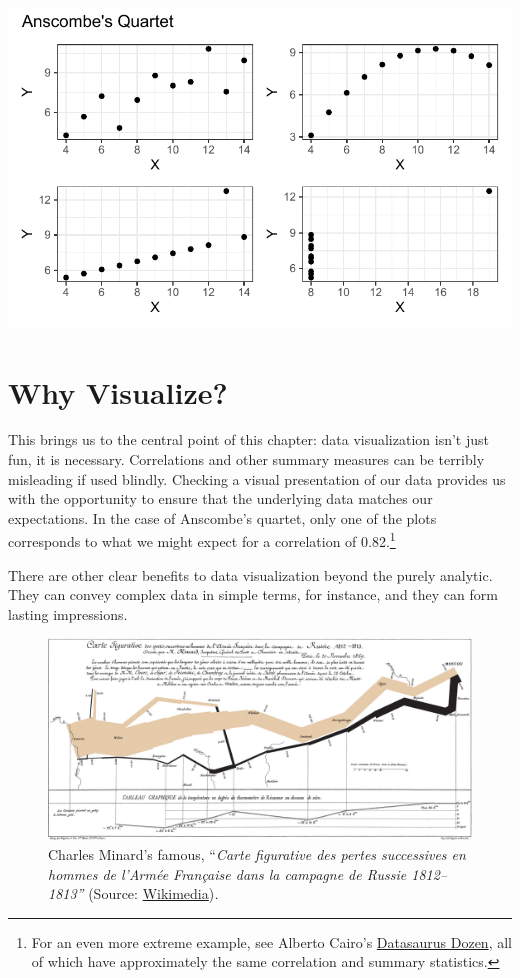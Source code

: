 \documentclass[
  letterpaper,
]{book}
\begin{document}
\includegraphics{visualizing-with-ggplot_files/figure-pdf/unnamed-chunk-8-1.pdf}

\hypertarget{why-visualize}{%
\section{Why Visualize?}\label{why-visualize}}

This brings us to the central point of this chapter: data visualization
isn't just fun, it is necessary. Correlations and other summary measures
can be terribly misleading if used blindly. Checking a visual
presentation of our data provides us with the opportunity to ensure that
the underlying data matches our expectations. In the case of Anscombe's
quartet, only one of the plots corresponds to what we might expect for a
correlation of 0.82.\footnote{For an even more extreme example, see
  Alberto Cairo's
  \href{https://jumpingrivers.github.io/datasauRus/}{Datasaurus Dozen},
  all of which have approximately the same correlation and summary
  statistics.}

There are other clear benefits to data visualization beyond the purely
analytic. They can convey complex data in simple terms, for instance,
and they can form lasting impressions.

\begin{figure}

{\centering \includegraphics{images/Minard_map of Napoleons march.png}

}

\caption{Charles Minard's famous, ``\emph{Carte figurative des pertes
successives en hommes de l'Armée Française dans la campagne de Russie
1812--1813''} (Source:
\href{https://commons.wikimedia.org/wiki/File:Minard.png}{Wikimedia})\emph{.}}

\end{figure}
\end{document}
